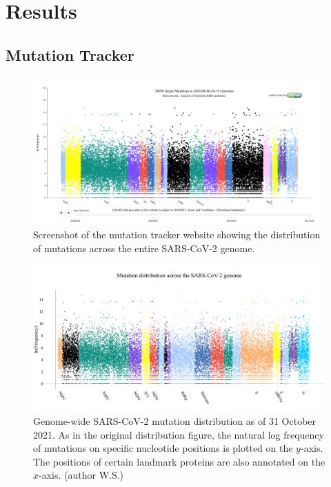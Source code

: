\documentclass{article}
\begin{document}
\hypertarget{results}{%
\section{Results}\label{results}}

\hypertarget{mutation-tracker}{%
\subsection{Mutation Tracker}\label{mutation-tracker}}

\begin{figure}

{\centering \includegraphics[width=\textwidth]{./figures/original_distribution} 

}

\caption{Screenshot of the mutation tracker website showing the distribution of mutations across the entire SARS-CoV-2 genome.}\label{fig:fig1}
\end{figure}

\begin{figure}

{\centering \includegraphics[width=\textwidth]{./figures/updated_distribution} 

}

\caption{Genome-wide SARS-CoV-2 mutation distribution as of 31 October 2021. As in the original distribution figure, the natural log frequency of mutations on specific nucleotide positions is plotted on the $y$-axis. The positions of certain landmark proteins are also annotated on the $x$-axis. (author W.S.)}\label{fig:fig2}
\end{figure}
\end{document}
